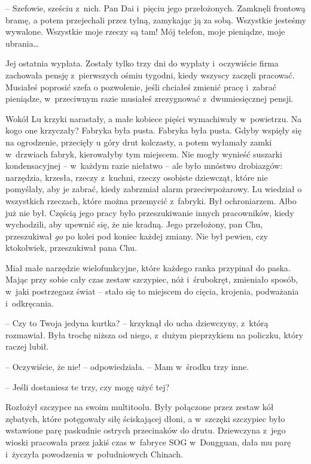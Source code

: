 \documentclass[oneside,polish,11pt,rmheadings]{mwbk}
\begin{document}
-- Szefowie, sześciu z~nich. Pan Dai i~pięciu jego przełożonych. Zamknęli frontową bramę, a potem przejechali przez tylną, zamykając ją za sobą. Wszystkie jesteśmy wywalone. Wszystkie moje rzeczy są tam! Mój telefon, moje pieniądze, moje ubrania\ldots  


Jej ostatnia wypłata. Zostały tylko trzy dni do wypłaty i~oczywiście firma zachowała pensję z~pierwszych ośmiu tygodni, kiedy wszyscy zaczęli pracować. Musiałeś poprosić szefa o pozwolenie, jeśli chciałeś zmienić pracę i~zabrać pieniądze, w~przeciwnym razie musiałeś zrezygnować z~dwumiesięcznej pensji. 


Wokół Lu krzyki narastały, a małe kobiece pięści wymachiwały w~powietrzu. Na kogo one krzyczały? Fabryka była pusta. Fabryka była pusta. Gdyby wspięły się na ogrodzenie, przecięły u góry drut kolczasty, a potem wyłamały zamki w~drzwiach fabryk, kierowałyby tym miejscem. Nie mogły wynieść suszarki kondensacyjnej -- w~każdym razie niełatwo -- ale było mnóstwo drobiazgów: narzędzia, krzesła, rzeczy z~kuchni, rzeczy osobiste dziewcząt, które nie pomyślały, aby je zabrać, kiedy zabrzmiał alarm przeciwpożarowy. Lu wiedział o wszystkich rzeczach, które można przemycić z~fabryki. Był ochroniarzem. Albo już nie był. Częścią jego pracy było przeszukiwanie innych pracowników, kiedy wychodzili, aby upewnić się, że nie kradną. Jego przełożony, pan Chu, przeszukiwał \textit{go }po kolei pod koniec każdej zmiany. Nie był pewien, czy ktokolwiek, przeszukiwał pana Chu. 


Miał małe narzędzie wielofunkcyjne, które każdego ranka przypinał do paska. Mając przy sobie cały czas zestaw szczypiec, nóż i~śrubokręt, zmieniało sposób, w~jaki postrzegasz świat -- stało się to miejscem do cięcia, krojenia, podważania i~odkręcania. 


-- Czy to Twoja jedyna kurtka? -- krzyknął do ucha dziewczyny, z~którą rozmawiał. Była trochę niższa od niego, z~dużym pieprzykiem na policzku, który raczej lubił. 


-- Oczywiście, że nie! -- odpowiedziała. -- Mam w~środku trzy inne.  


-- Jeśli dostaniesz te trzy, czy mogę użyć tej? 

 Rozłożył szczypce na swoim multitoolu. Były połączone przez zestaw kół zębatych, które potęgowały siłę ściskającej dłoni, a w~szczęki szczypiec było wstawione parę paskudnie ostrych przecinaków do drutu. Dziewczyna z~jego wioski pracowała przez jakiś czas w~fabryce SOG w~Dongguan, dała mu parę i~życzyła powodzenia w~południowych Chinach. 
\end{document}
